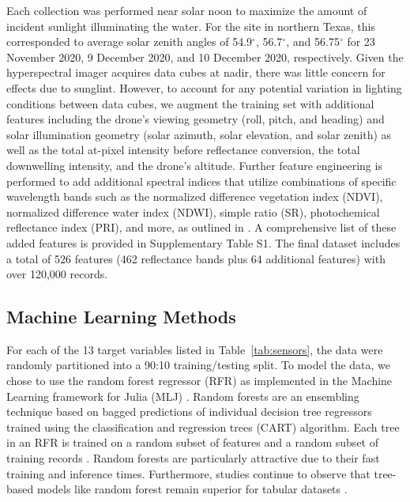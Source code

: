 \documentclass[remotesensing,article,accept,pdftex,moreauthors]{Definitions/mdpi}
\begin{document}
Each collection was performed near solar noon to maximize the amount of incident sunlight illuminating the water. For the site in northern Texas, this corresponded to average solar zenith angles of 54.9$^{\circ}$, 56.7$^{\circ}$, and 56.75$^{\circ}$ for 23 November 2020, 9 December 2020, and 10 December 2020, respectively. Given the hyperspectral imager acquires data cubes at nadir, there was little concern for effects due to sunglint. However, to account for any potential variation in lighting conditions between data cubes, we augment the training set with additional features including the drone's viewing geometry (roll, pitch, and heading) and solar illumination geometry (solar azimuth, solar elevation, and solar zenith) as well as the total at-pixel intensity before reflectance conversion, the total downwelling intensity, and the drone's altitude. Further feature engineering is performed to add additional spectral indices that utilize combinations of specific wavelength bands such as the normalized difference vegetation index (NDVI), normalized difference water index (NDWI), simple ratio (SR), photochemical reflectance index (PRI), and more, as outlined in \cite{envi_vegetation_indices, thenkabail2018hyperspectral,kaufman1992atmospherically, SpectralIndexWheat}. A comprehensive list of these added features is provided in Supplementary Table S1. The final dataset includes a total of 526 features (462 reflectance bands plus 64 additional features) with over 120,000 records. 

\subsection{Machine Learning Methods}

For each of the 13 target variables listed in Table~\ref{tab:sensors}, the data were randomly partitioned into a 90:10 training/testing split. To model the data, we chose to use the random forest regressor (RFR) as implemented in the Machine Learning framework for Julia (MLJ) \cite{random-forest-regression, MLJ1}.  Random forests are an ensembling technique based on bagged predictions of individual decision tree regressors trained using the classification and regression trees (CART) algorithm. Each tree in an RFR is trained on a random subset of features and a random subset of training records \cite{decision-tree, random-forest}. Random forests are particularly attractive due to their fast training and inference times. Furthermore, studies continue to observe that tree-based models like random forest remain superior for tabular datasets \cite{grinsztajn2022tree, shwartz2022tabular}.
\end{document}

